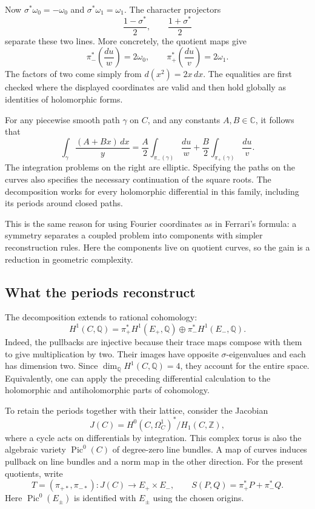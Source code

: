\documentclass[11pt]{article}
\theoremstyle{remark}
\newcommand{\Q}{\mathbb Q}
\newcommand{\C}{\mathbb C}
\begin{document}
Now \(\sigma^*\omega_0=-\omega_0\) and \(\sigma^*\omega_1=\omega_1\). The character projectors
\[
\frac{1-\sigma^*}{2},\qquad \frac{1+\sigma^*}{2}
\]
separate these two lines. More concretely, the quotient maps give
\begin{equation}
\pi_-^*\left(\frac{du}{w}\right)=2\omega_0,
\qquad
\pi_+^*\left(\frac{du}{v}\right)=2\omega_1.
\label{geometry:differential-pullbacks}
\end{equation}
The factors of two come simply from \(d(x^2)=2x\,dx\). The equalities are first checked where the displayed coordinates are valid and then hold globally as identities of holomorphic forms.

For any piecewise smooth path \(\gamma\) on \(C\), and any constants \(A,B\in\C\), it follows that
\begin{equation}
\boxed{
\int_\gamma\frac{(A+Bx)\,dx}{y}
=\frac A2\int_{\pi_-(\gamma)}\frac{du}{w}
+\frac B2\int_{\pi_+(\gamma)}\frac{du}{v}.}
\label{geometry:integral-splitting}
\end{equation}
The integration problems on the right are elliptic. Specifying the paths on the curves also specifies the necessary continuation of the square roots. The decomposition works for every holomorphic differential in this family, including its periods around closed paths.

This is the same reason for using Fourier coordinates as in Ferrari's formula: a symmetry separates a coupled problem into components with simpler reconstruction rules. Here the components live on quotient curves, so the gain is a reduction in geometric complexity.

\subsection{What the periods reconstruct}

The decomposition extends to rational cohomology:
\begin{equation}
H^1(C,\Q)
=\pi_+^*H^1(E_+,\Q)\oplus\pi_-^*H^1(E_-,\Q).
\label{geometry:h1-splitting}
\end{equation}
Indeed, the pullbacks are injective because their trace maps compose with them to give multiplication by two. Their images have opposite \(\sigma\)-eigenvalues and each has dimension two. Since \(\dim_\Q H^1(C,\Q)=4\), they account for the entire space. Equivalently, one can apply the preceding differential calculation to the holomorphic and antiholomorphic parts of cohomology.

To retain the periods together with their lattice, consider the Jacobian
\[
J(C)=H^0(C,\Omega_C^1)^*/H_1(C,\mathbb Z),
\]
where a cycle acts on differentials by integration. This complex torus is also the algebraic variety \(\operatorname{Pic}^0(C)\) of degree-zero line bundles. A map of curves induces pullback on line bundles and a norm map in the other direction. For the present quotients, write
\[
T=(\pi_{+*},\pi_{-*}):J(C)\longrightarrow E_+\times E_- ,
\qquad
S(P,Q)=\pi_+^*P+\pi_-^*Q.
\]
Here \(\operatorname{Pic}^0(E_\pm)\) is identified with \(E_\pm\) using the chosen origins.
\end{document}
